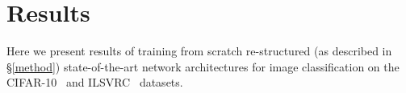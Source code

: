 \documentclass[thesis]{subfiles}
\begin{document}
	
	
	
	
	\section{Results}
	Here we present results of training from scratch re-structured (as described in \S\ref{method}) state-of-the-art network architectures for image classification on the CIFAR-10~\cite{krizhevsky2009learning} and ILSVRC~\citep{ILSVRC15} datasets.
	
\end{document}
